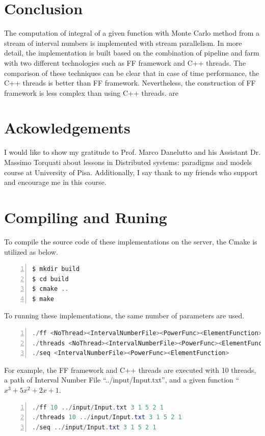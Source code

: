\documentclass[runningheads,a4paper]{llncs}
\begin{document}
\section{Conclusion}
\label{Conc}
The computation of integral of a given function with Monte Carlo method from a stream of
interval numbers is implemented with stream parallelism. In more detail, the implementation
is built based on the combination of pipeline and farm with two different technologies such
as FF framework and C++ threads. The comparison of these techniques can be clear that in
case of time performance, the C++ threads is better than FF framework. Nevertheless, the
construction of FF framework is less complex than using C++ threads.
are

\section{Ackowledgements}
I would like to show my gratitude to Prof. Marco Danelutto and his Assistant Dr. Massimo Torquati about lessons in Distributed systems: paradigms and models course at University of Pisa.
Additionally, I say thank to my friends who support and encourage me in this course.





\section{Compiling and Runing}
To compile the source code of these implementations on the server, the Cmake is utilized as below.
\begin{lstlisting}[numbers=left,language=Java,frame=single,breaklines=false,label=SelfishAlgorithm.]
$ mkdir build
$ cd build
$ cmake ..
$ make
\end{lstlisting}
To running these implementations, the same number of parameters are used.
\begin{lstlisting}[numbers=left,language=Java,frame=single,breaklines=false,label=SelfishAlgorithm]
./ff <NoThread><IntervalNumberFile><PowerFunc><ElementFunction>
./threads <NoThread><IntervalNumberFile><PowerFunc><ElementFunction>
./seq <IntervalNumberFile><PowerFunc><ElementFunction>
\end{lstlisting}
For example, the FF framework and C++ threads are executed with 10 threads, a path of
Interval Number File ``../input/Input.txt'', and a given function “$x^{3} + 5x^{2} + 2x +1$.
\begin{lstlisting}[numbers=left,language=Java,frame=single,breaklines=false,label=SelfishAlgorithm]
./ff 10 ../input/Input.txt 3 1 5 2 1
./threads 10 ../input/Input.txt 3 1 5 2 1
./seq ../input/Input.txt 3 1 5 2 1
\end{lstlisting}
\end{document}
